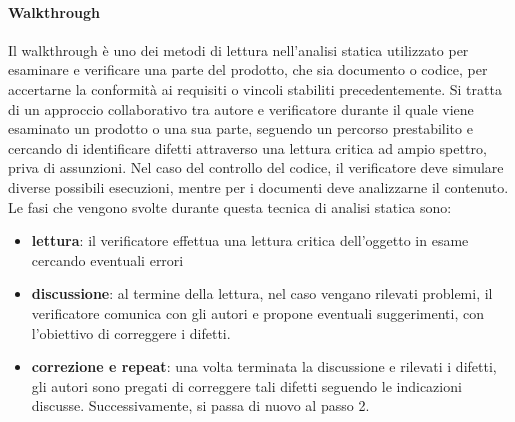 \paragraph{Walkthrough}
Il walkthrough è uno dei metodi di lettura nell'analisi statica utilizzato per esaminare e verificare una parte del prodotto, che sia documento o codice, per accertarne la conformità ai requisiti o vincoli stabiliti precedentemente.
Si tratta di un approccio collaborativo tra autore e verificatore durante il quale viene esaminato un prodotto o una sua parte, seguendo un percorso prestabilito e cercando di identificare difetti attraverso una lettura critica ad ampio spettro, priva di assunzioni.
Nel caso del controllo del codice, il verificatore deve simulare diverse possibili esecuzioni, mentre per i documenti deve analizzarne il contenuto.
Le fasi che vengono svolte durante questa tecnica di analisi statica sono:
\begin{itemize}
    \item \textbf{lettura}: il verificatore effettua una lettura critica dell'oggetto in esame cercando eventuali errori
    \item \textbf{discussione}: al termine della lettura, nel caso vengano rilevati problemi, il verificatore comunica con gli autori e propone eventuali suggerimenti, con l'obiettivo di correggere i difetti.
    \item \textbf{correzione e repeat}: una volta terminata la discussione e rilevati i difetti, gli autori sono pregati di correggere tali difetti seguendo le indicazioni discusse. Successivamente, si passa di nuovo al passo 2.
\end{itemize}
